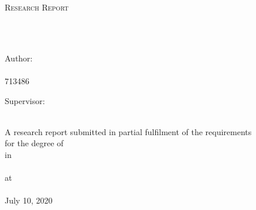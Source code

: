 \documentclass[
12pt, %
oneside, %
english, %
onehalfspacing, %
liststotoc, %
headsepline, %
chapterinoneline, %
svgnames %
]{MastersDoctoralThesis} %
\author{Monique Jessica Bennett} %
\begin{document}
\frontmatter %

\pagestyle{thesisSimple} %


\begin{titlepage}
\begin{center}
	

\vspace*{.06\textheight}
\textsc{\Large Research Report}\\[0.5cm] %

\HRule \\[0.4cm] %
{\huge \bfseries \ttitle\par}\vspace{0.4cm} %
\HRule \\[1.5cm] %
 
\begin{minipage}[t]{0.4\textwidth}
\begin{flushleft} \large
Author:\\
\authorname\\ %
713486
\end{flushleft}
\end{minipage}
\begin{minipage}[t]{0.4\textwidth}
\begin{flushright} \large
Supervisor: \\
\supname %
\end{flushright}
\end{minipage}\\[1.5cm]
 

\large A research report submitted in partial fulfilment of the requirements\\ for the degree of \degreename\\ %
in\\
\deptname\\
at\\
\univname\\[0.5cm] %

{\large July 10, 2020}\\ %

\end{center}
\end{titlepage}
\end{document}
